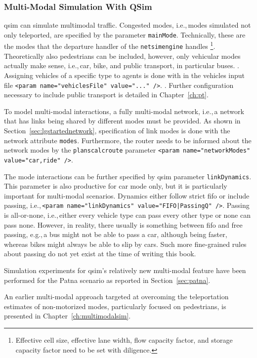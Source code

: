 \subsubsection{Multi-Modal Simulation With QSim}
\label{sec:multimodalsim_qsim}
\gls{qsim} can simulate \gls{multimodal} traffic. Congested modes, i.e.,\,modes simulated not only teleported, are specified by the parameter \lstinline|mainMode|. Technically, these are the modes that the departure handler of the \lstinline|netsimengine| handles 
\footnote{Effective cell size, effective lane width, flow capacity factor, and storage capacity factor need to be set with diligence.}. 
Theoretically also pedestrians can be included, however, only vehicular modes actually make sense, i.e.,\,car, bike, and public transport, in particular buses. 
. 
Assigning vehicles of a specific type to agents is done with in the vehicles input file \lstinline|<param name="vehiclesFile" value="..." />|. 
. 
Further configuration necessary to include public transport is detailed in Chapter~\ref{ch:pt}.

To model multi-modal interactions, a fully multi-modal network, i.e.,\,a network that has links being shared by different modes must be provided. 
As shown in Section~\ref{sec:lgstartednetwork}, specification of link modes is done with the network attribute \lstinline|modes|.
Furthermore, the router needs to be informed about the network modes by the \lstinline|planscalcroute| parameter \lstinline|<param name="networkModes" value="car,ride" />|.

The mode interactions can be further specified by \gls{qsim} parameter \lstinline|linkDynamics|. 
This parameter is also productive for car mode only, but it is particularly important for multi-modal scenarios. 
Dynamics either follow strict \gls{fifo} or include passing, i.e.,\,\lstinline$<param name="linkDynamics" value="FIFO|PassingQ" />$. 
Passing is all-or-none, i.e.,\,either every vehicle type can pass every other type or none can pass none. 
However, in reality, there usually is something between \gls{fifo} and free passing, e.g.,\,a bus might not be able to pass a car, although being faster, whereas bikes might always be able to slip by cars. Such more fine-grained rules about passing do not yet exist at the time of writing this book. 

Simulation experiments for \gls{qsim}'s relatively new multi-modal feature have been performed for the Patna scenario as reported in Section~\ref{sec:patna}.

An earlier multi-modal approach targeted at overcoming the teleportation estimates of non-motorized modes, particularly focused on pedestrians, is presented in Chapter~\ref{ch:multimodalsim}.


